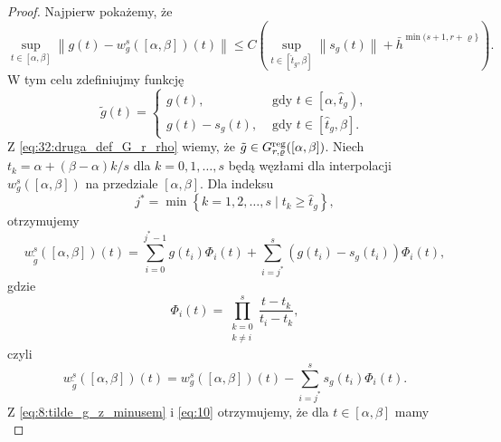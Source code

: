 \documentclass[oik, pdftex, man]{mgrwms}
\begin{document}
    \begin{proof}
        Najpierw pokażemy, że
        \begin{equation} \label{eq:7}
            \sup _{t \in[\alpha, \beta]}\left\|g(t)-w_{g}^{s}([\alpha, \beta])(t)\right\| \leq C\left(\sup _{t \in\left[\hat{t}_{g}, \beta\right]}\left\|s_{g}(t)\right\|+\bar{h}^{\min (s+1, r+\varrho\}}\right).
        \end{equation}
        W tym celu zdefiniujmy funkcję
        \begin{equation} \label{eq:8:tilde_g_z_minusem}
            \tilde{g}(t)= \begin{cases}
                g(t),            & \text { gdy } t \in\left[\alpha, \hat{t}_{g}\right), \\ 
                g(t)-s_{g}(t),   & \text { gdy } t \in\left[\hat{t}_{g}, \beta\right].
            \end{cases}
        \end{equation}
        Z \eqref{eq:32:druga_def_G_r_rho} wiemy, że $\tilde{g} \in G_{r, \varrho}^{\mathrm{reg}}([\alpha, \beta])$. Niech $t_{k}=\alpha+(\beta-\alpha) k / s$ dla $k=0,1, \ldots, s$ będą węzłami dla interpolacji $w_{g}^{s}([\alpha, \beta])$ na przedziale $[\alpha, \beta]$. Dla indeksu
        \begin{equation} \label{eq:9}
            j^{*}=\min \left\{k=1,2, \ldots, s \mid t_{k} \geq \hat{t}_{g}\right\},
        \end{equation}
        otrzymujemy
        \begin{equation} \label{eq:10}
            w_{\tilde{g}}^{s}([\alpha, \beta])(t)=\sum_{i=0}^{j^{*}-1} g\left(t_{i}\right) \Phi_{i}(t)+\sum_{i=j^{*}}^{s}\left(g\left(t_{i}\right)-s_{g}\left(t_{i}\right)\right) \Phi_{i}(t),
        \end{equation}
        gdzie
        \begin{equation*}
            \Phi_{i}(t)=\prod_{\substack{k=0 \\ k \neq i}}^{s} \frac{t-t_{k}}{t_{i}-t_{k}},
        \end{equation*}
        czyli
        \begin{equation*} \label{eq:11}
            w_{\tilde{g}}^{s}([\alpha, \beta])(t)=w_{g}^{s}([\alpha, \beta])(t)-\sum_{i=j^{*}}^{s} s_{g}\left(t_{i}\right) \Phi_{i}(t).
        \end{equation*}
        Z \eqref{eq:8:tilde_g_z_minusem} i \eqref{eq:10} otrzymujemy, że dla $t \in [\alpha, \beta]$ mamy
        \begin{equation*} \label{eq:12}

\end{equation*}
\end{proof}
\end{document}
